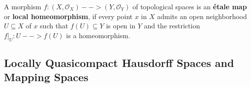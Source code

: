 \begin{lemma}
\end{lemma}

\begin{definition}
	A morphism $f:(X,\mathcal{O}_X) --> (Y,\mathcal{O}_Y)$ of topological spaces is an \textbf{étale map} or \textbf{local homeomorphism}, if every point $x$ in $X$ admits an open neighborhood $U \subseteq X$ of $x$ such that $f(U) \subseteq Y$ is open in $Y$ and the restriction $f\vert_U: U --> f(U)$ is a homeomorphism. 
\end{definition}

\subsection{Locally Quasicompact Hausdorff Spaces and Mapping Spaces}

\newpage
